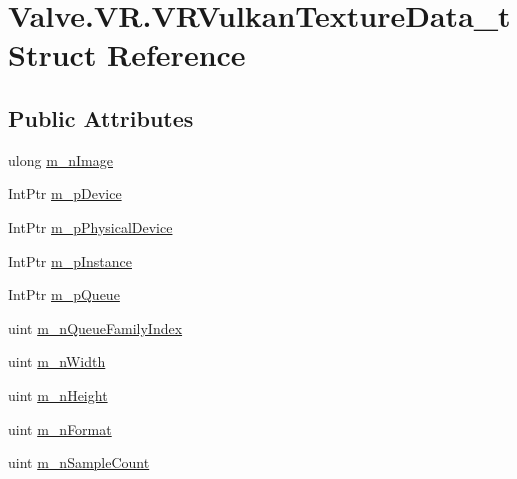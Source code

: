 \hypertarget{struct_valve_1_1_v_r_1_1_v_r_vulkan_texture_data__t}{}\section{Valve.\+V\+R.\+V\+R\+Vulkan\+Texture\+Data\+\_\+t Struct Reference}
\label{struct_valve_1_1_v_r_1_1_v_r_vulkan_texture_data__t}
\subsection*{Public Attributes}
\begin{DoxyCompactItemize}
\item 
ulong \mbox{\hyperlink{struct_valve_1_1_v_r_1_1_v_r_vulkan_texture_data__t_a80019cb34b11228aaae1470e3e685589}{m\+\_\+n\+Image}}
\item 
Int\+Ptr \mbox{\hyperlink{struct_valve_1_1_v_r_1_1_v_r_vulkan_texture_data__t_ac260b1a43b8fd13cf678018743172508}{m\+\_\+p\+Device}}
\item 
Int\+Ptr \mbox{\hyperlink{struct_valve_1_1_v_r_1_1_v_r_vulkan_texture_data__t_a7f506ccbf13b60e30be4295f28769942}{m\+\_\+p\+Physical\+Device}}
\item 
Int\+Ptr \mbox{\hyperlink{struct_valve_1_1_v_r_1_1_v_r_vulkan_texture_data__t_afeefd7d8efd4b5668b60656efbfd0765}{m\+\_\+p\+Instance}}
\item 
Int\+Ptr \mbox{\hyperlink{struct_valve_1_1_v_r_1_1_v_r_vulkan_texture_data__t_a5cef751c75883cac0533f8b66e21b694}{m\+\_\+p\+Queue}}
\item 
uint \mbox{\hyperlink{struct_valve_1_1_v_r_1_1_v_r_vulkan_texture_data__t_a74957e76fd3d0264b292309e16170b06}{m\+\_\+n\+Queue\+Family\+Index}}
\item 
uint \mbox{\hyperlink{struct_valve_1_1_v_r_1_1_v_r_vulkan_texture_data__t_a9b9192e721e6f6763bb024b7d7035fc2}{m\+\_\+n\+Width}}
\item 
uint \mbox{\hyperlink{struct_valve_1_1_v_r_1_1_v_r_vulkan_texture_data__t_ae949765be70702e00986bffc36fcebe7}{m\+\_\+n\+Height}}
\item 
uint \mbox{\hyperlink{struct_valve_1_1_v_r_1_1_v_r_vulkan_texture_data__t_ad356f6f6d81480c68441f9d4c168572e}{m\+\_\+n\+Format}}
\item 
uint \mbox{\hyperlink{struct_valve_1_1_v_r_1_1_v_r_vulkan_texture_data__t_aad5eac7662d8853d60a31bbbcf51f6e1}{m\+\_\+n\+Sample\+Count}}
\end{DoxyCompactItemize}


